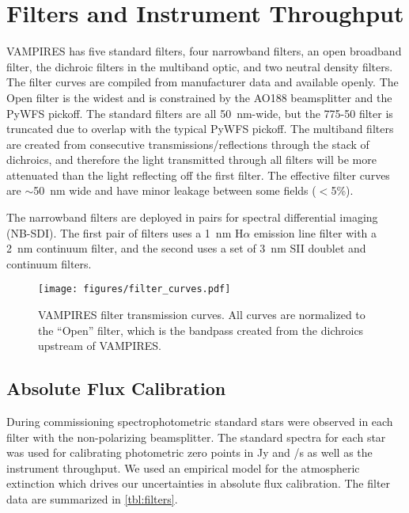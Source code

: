\section{Filters and Instrument Throughput}\label{sec:filters}

VAMPIRES has five standard filters, four narrowband filters, an open broadband filter, the dichroic filters in the multiband optic, and two neutral density filters. The filter curves are compiled from manufacturer data and available openly. The Open filter is the widest and is constrained by the AO188 beamsplitter and the PyWFS pickoff. The standard filters are all \SI{50}{\nm}-wide, but the 775-50 filter is truncated due to overlap with the typical PyWFS pickoff. The multiband filters are created from consecutive transmissions/reflections through the stack of dichroics, and therefore the light transmitted through all filters will be more attenuated than the light reflecting off the first filter. The effective filter curves are $\sim$\SI{50}{\nm} wide and have minor leakage between some fields ($<$5\%).

The narrowband filters are deployed in pairs for spectral differential imaging (NB-SDI). The first pair of filters uses a \SI{1}{\nm} H$\alpha$ emission line filter with a \SI{2}{\nm} continuum filter, and the second uses a set of \SI{3}{\nm} SII doublet and continuum filters.

\begin{figure}
    \centering
    \texttt{[image: figures/filter\_curves.pdf]}
    \caption{VAMPIRES filter transmission curves. All curves are normalized to the ``Open'' filter, which is the bandpass created from the dichroics upstream of VAMPIRES.\label{fig:filters}}
\end{figure}

\subsection{Absolute Flux Calibration}

During commissioning spectrophotometric standard stars were observed in each filter with the non-polarizing beamsplitter. The standard spectra for each star was used for calibrating photometric zero points in \si{Jy} and \si{\electron/\second} as well as the instrument throughput. We used an empirical model for the atmospheric extinction \citep{buton_atmospheric_2013} which drives our uncertainties in absolute flux calibration. The filter data are summarized in \autoref{tbl:filters}.

